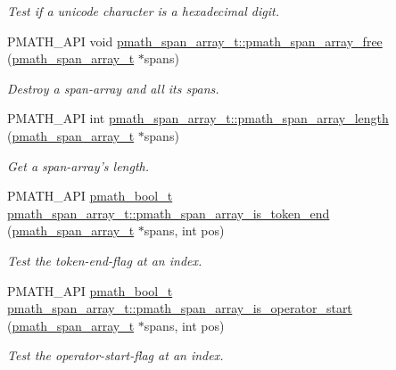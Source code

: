 \begin{CompactItemize}
\begin{CompactList}\small\item\em Test if a unicode character is a hexadecimal digit. \item\end{CompactList}\item 
PMATH\_\-API void \hyperlink{group__parser_gceb05ef4c39c239d68f39e3b9bde5f1e}{pmath\_\-span\_\-array\_\-t::pmath\_\-span\_\-array\_\-free} (\hyperlink{classpmath__span__array__t}{pmath\_\-span\_\-array\_\-t} $\ast$spans)
\begin{CompactList}\small\item\em Destroy a span-array and all its spans. \item\end{CompactList}\item 
PMATH\_\-API int \hyperlink{group__parser_g30df905fabf7b04493548bcafe85d3d4}{pmath\_\-span\_\-array\_\-t::pmath\_\-span\_\-array\_\-length} (\hyperlink{classpmath__span__array__t}{pmath\_\-span\_\-array\_\-t} $\ast$spans)
\begin{CompactList}\small\item\em Get a span-array's length. \item\end{CompactList}\item 
PMATH\_\-API \hyperlink{group__general__types_gc92090cb0b56345d6c379ed2341d4ef4}{pmath\_\-bool\_\-t} \hyperlink{group__parser_g0bb7df579ed425ec719cf2eb85093517}{pmath\_\-span\_\-array\_\-t::pmath\_\-span\_\-array\_\-is\_\-token\_\-end} (\hyperlink{classpmath__span__array__t}{pmath\_\-span\_\-array\_\-t} $\ast$spans, int pos)
\begin{CompactList}\small\item\em Test the token-end-flag at an index. \item\end{CompactList}\item 
PMATH\_\-API \hyperlink{group__general__types_gc92090cb0b56345d6c379ed2341d4ef4}{pmath\_\-bool\_\-t} \hyperlink{group__parser_g7ca9a7b13aef344ba903b33f07ba912a}{pmath\_\-span\_\-array\_\-t::pmath\_\-span\_\-array\_\-is\_\-operator\_\-start} (\hyperlink{classpmath__span__array__t}{pmath\_\-span\_\-array\_\-t} $\ast$spans, int pos)
\begin{CompactList}\small\item\em Test the operator-start-flag at an index. \item\end{CompactList}\item 

\end{CompactItemize}
